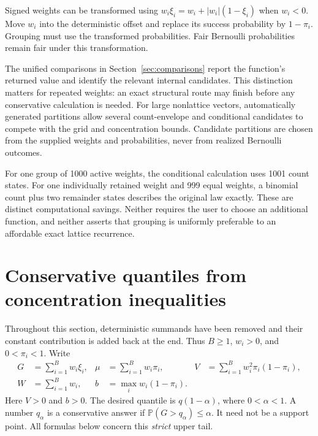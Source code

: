\documentclass[11pt,letterpaper]{article}
\numberwithin{equation}{section}
\theoremstyle{definition}
\theoremstyle{remark}
\begin{document}
Signed weights can be transformed using
$w_i\xi_i=w_i+|w_i|(1-\xi_i)$ when $w_i<0$. Move $w_i$ into the
deterministic offset and replace its success probability by $1-\pi_i$.
Grouping must use the transformed probabilities. Fair Bernoulli
probabilities remain fair under this transformation.

The unified comparisons in Section~\ref{sec:comparisons} report the
function's returned value and identify the relevant internal candidates.
This distinction matters for repeated weights: an exact structural route
may finish before any conservative calculation is needed. For large
nonlattice vectors, automatically generated partitions allow several
count-envelope and conditional candidates to compete with the grid and
concentration bounds. Candidate partitions are chosen from the supplied
weights and probabilities, never from realized Bernoulli outcomes.

For one group of 1000 active weights, the conditional calculation uses
1001 count states. For one individually retained weight and 999 equal
weights, a binomial count plus two remainder states describes the original
law exactly. These are distinct computational savings. Neither requires
the user to choose an additional function, and neither asserts that
grouping is uniformly preferable to an affordable exact lattice
recurrence.

\section{Conservative quantiles from concentration inequalities}
\label{sec:concentration}

Throughout this section, deterministic summands have been removed and their
constant contribution is added back at the end. Thus $B\ge1$, $w_i>0$, and
$0<\pi_i<1$. Write
\begin{equation}
  \begin{aligned}
  G&=\sum_{i=1}^B w_i\xi_i,&
  \mu&=\sum_{i=1}^B w_i\pi_i,&
  V&=\sum_{i=1}^B w_i^2\pi_i(1-\pi_i),\\
  W&=\sum_{i=1}^B w_i,&
  b&=\max_i w_i(1-\pi_i).&&
  \end{aligned}
  \label{eq:concentration-moments}
\end{equation}
Here $V>0$ and $b>0$. The desired quantile is $q(1-\alpha)$,
where $0<\alpha<1$. A number $q_\alpha$ is a conservative answer if
$\mathbb{P}(G>q_\alpha)\le\alpha$. It need not be a support point.
All formulas below concern this \emph{strict} upper tail.
\end{document}
